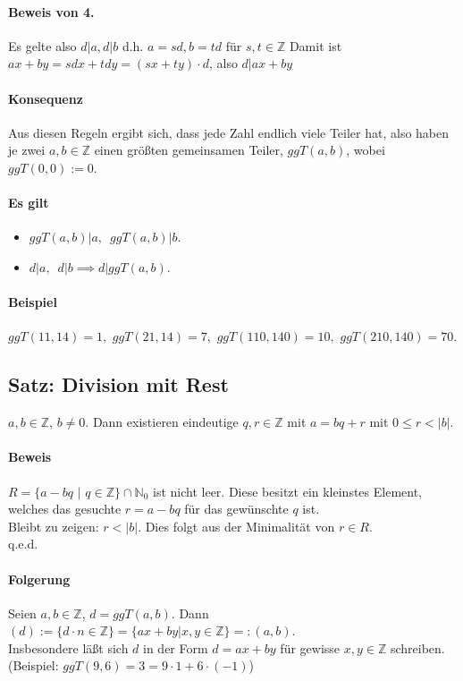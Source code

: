 \documentclass[14pt,a4paper]{article}
\newcommand{\Z}{\ensuremath{\mathbb{Z}}}
\begin{document}
   		   \paragraph{Beweis von 4.}
   			   Es gelte also $d|a, d|b$ d.h. $a=sd, b=td \text{ für } s,t \in \mathbb{Z}$
   			   Damit ist $ax+by=sdx+tdy=(sx+ty)\cdot d$, also $d|ax+by$

   		   \paragraph{Konsequenz}
   			   Aus diesen Regeln ergibt sich, dass jede Zahl endlich viele Teiler hat, also haben je zwei $a,b \in \mathbb{Z}$ einen größten gemeinsamen Teiler, $ggT(a,b)$, wobei $ggT(0,0) := 0$.

   		   \paragraph{Es gilt}
   			   \begin{itemize}
   				   \item$ggT(a,b) | a,\,\,\, ggT(a,b) | b$.
   				   \item $d|a,\,\,\,d|b \implies d|ggT(a,b)$.
   			   \end{itemize}

   		   \paragraph{Beispiel}
   			   $ggT(11,14) = 1,\,\, ggT(21,14) = 7,\,\, ggT(110, 140) = 10,\,\, ggT(210, 140) = 70$.

   	   \subsection{Satz: Division mit Rest}
   		   $ a,b \in \mathbb{Z},\,b \neq 0 $. Dann existieren eindeutige $ q,r \in \mathbb{Z} $ mit $ a = bq + r $ mit $ 0 \leq r < |b| $.
   		   \paragraph{Beweis}
   			   $ R = \{ a - bq\,\,|\,\,q \in \mathbb{Z} \} \cap \mathbb{N}_0 $ ist nicht leer.
   			   Diese besitzt ein kleinstes Element, welches das gesuchte $ r = a - bq $ für das gewünschte $q$ ist.\\
   			   Bleibt zu zeigen: $r < |b|$. Dies folgt aus der Minimalität von $r \in R$. \\
   			   q.e.d.
   		   \paragraph{Folgerung}
   			   Seien $ a,b \in \Z$, $d=ggT(a,b) $. Dann $ (d) := \{d \cdot n \in \Z\} = \{ax + by | x,y \in \Z \} =: (a,b) $. \\
   			   Insbesondere läßt sich $d$ in der Form $d = ax + by$ für gewisse $ x,y \in \Z$ schreiben.
   			   (Beispiel: $ ggT(9, 6) = 3 = 9 \cdot 1 + 6 \cdot (-1) $)
\end{document}
